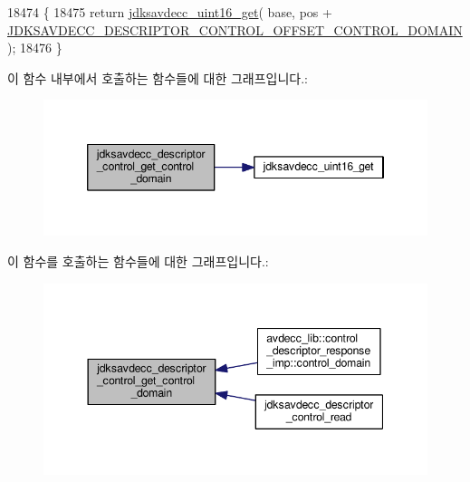 \begin{DoxyCode}
18474 \{
18475     \textcolor{keywordflow}{return} \hyperlink{group__endian_ga3fbbbc20be954aa61e039872965b0dc9}{jdksavdecc\_uint16\_get}( base, pos + 
      \hyperlink{group__descriptor__control_ga4b283275da4eaebf7dce5ee3ef23e290}{JDKSAVDECC\_DESCRIPTOR\_CONTROL\_OFFSET\_CONTROL\_DOMAIN} );
18476 \}
\end{DoxyCode}


이 함수 내부에서 호출하는 함수들에 대한 그래프입니다.\+:
\nopagebreak
\begin{figure}[H]
\begin{center}
\leavevmode
\includegraphics[width=346pt]{group__descriptor__control_gacaf61b58bf830f4b1624075f361ecbf5_cgraph}
\end{center}
\end{figure}




이 함수를 호출하는 함수들에 대한 그래프입니다.\+:
\nopagebreak
\begin{figure}[H]
\begin{center}
\leavevmode
\includegraphics[width=344pt]{group__descriptor__control_gacaf61b58bf830f4b1624075f361ecbf5_icgraph}
\end{center}
\end{figure}


